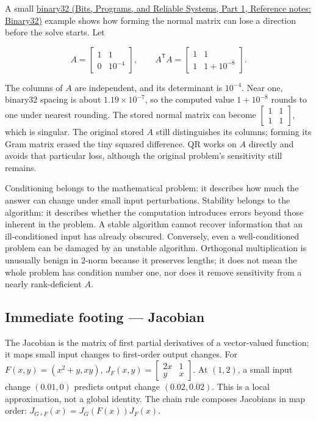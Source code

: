 A small \href{../01-Bits-Programs-and-Reliable-Systems-P01/main.pdf\#nameddest=appendix-5057f9ad327f}{binary32 (Bits, Programs, and Reliable Systems, Part 1, Reference notes: Binary32)} example shows how forming the normal matrix can lose a direction before the solve starts. Let

\[
A=\begin{bmatrix}1&1\\0&10^{-4}\end{bmatrix},\qquad
A^\mathsf TA=\begin{bmatrix}1&1\\1&1+10^{-8}\end{bmatrix}.
\]

The columns of \(A\) are independent, and its determinant is \(10^{-4}\). Near one, binary32 spacing is about \(1.19\times10^{-7}\), so the computed value \(1+10^{-8}\) rounds to one under nearest rounding. The stored normal matrix can become \(\begin{bmatrix}1&1\\1&1\end{bmatrix}\), which is singular. The original stored \(A\) still distinguishes its columns; forming its Gram matrix erased the tiny squared difference. QR works on \(A\) directly and avoids that particular loss, although the original problem's sensitivity still remains.

Conditioning belongs to the mathematical problem: it describes how much the answer can change under small input perturbations. Stability belongs to the algorithm: it describes whether the computation introduces errors beyond those inherent in the problem. A stable algorithm cannot recover information that an ill-conditioned input has already obscured. Conversely, even a well-conditioned problem can be damaged by an unstable algorithm. Orthogonal multiplication is unusually benign in 2-norm because it preserves lengths; it does not mean the whole problem has condition number one, nor does it remove sensitivity from a nearly rank-deficient \(A\).

\subsection{Immediate footing --- Jacobian}\label{01-foundations-i-ch020-immediate-footing-jacobian}

\hypertarget{01-foundations-i-ch020-immediate-footing-jacobian}{}

The Jacobian is the matrix of first partial derivatives of a vector-valued function; it maps small input changes to first-order output changes. For \(F(x,y)=(x^2+y,xy)\), \(J_F(x,y)=\begin{bmatrix}2x&1\\y&x\end{bmatrix}\). At \((1,2)\), a small input change \((0.01,0)\) predicts output change \((0.02,0.02)\). This is a local approximation, not a global identity. The chain rule composes Jacobians in map order: \(J_{G\circ F}(x)=J_G(F(x))J_F(x)\).

